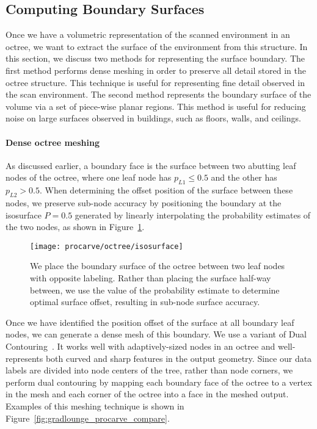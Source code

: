 \documentclass[12pt,onecolumn,oneside]{book}
\begin{document}
\subsection{Computing Boundary Surfaces}
\label{ssec:procarve_boundary}

Once we have a volumetric representation of the scanned environment in an octree, we want to extract the surface of the environment from this structure.  In this section, we discuss two methods for representing the surface boundary.  The first method performs dense meshing in order to preserve all detail stored in the octree structure.  This technique is useful for representing fine detail observed in the scan environment.  The second method represents the boundary surface of the volume via a set of piece-wise planar regions.  This method is useful for reducing noise on large surfaces observed in buildings, such as floors, walls, and ceilings.

\paragraph*{Dense octree meshing}
As discussed earlier, a boundary face is the surface between two abutting leaf nodes of the octree, where one leaf node has $p_{L1} \leq 0.5$ and the other has $p_{L2} > 0.5$.  When determining the offset position of the surface between these nodes, we preserve sub-node accuracy by positioning the boundary at the isosurface $P = 0.5$ generated by linearly interpolating the probability estimates of the two nodes, as shown in Figure~\ref{fig:octree_isosurface}.

\begin{figure}[h!]
	\centerline{\texttt{[image: procarve/octree/isosurface]}}
	\caption[Determining sub-node accuracy for boundary surface.]{We place the boundary surface of the octree between two leaf nodes with opposite labeling.  Rather than placing the surface half-way between, we use the value of the probability estimate to determine optimal surface offset, resulting in sub-node surface accuracy.}
	\label{fig:octree_isosurface}
\end{figure}

Once we have identified the position offset of the surface at all boundary leaf nodes, we can generate a dense mesh of this boundary.  We use a variant of Dual Contouring~\cite{DualContouring}.  It works well with adaptively-sized nodes in an octree and well-represents both curved and sharp features in the output geometry.  Since our data labels are divided into node centers of the tree, rather than node corners, we perform dual contouring by mapping each boundary face of the octree to a vertex in the mesh and each corner of the octree into a face in the meshed output.  Examples of this meshing technique is shown in Figure~\ref{fig:gradlounge_procarve_compare}.
\end{document}
